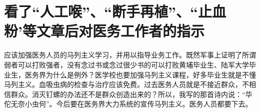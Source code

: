 \section[看了“人工喉”、“断手再植”、“止血粉’等文章后对医务工作者的指示（一九六六年三月十二日）]{看了“人工喉”、“断手再植”、“止血粉’等文章后对医务工作者的指示}


应该加强医务人员的马列主义学习，并用以指导业务工作。既然军事上证明了所谓弱者可以打败强者，没有念过书或念过很少书的可以打败黄埔毕业生、陆军大学毕业生，医务界为什么是例外？医学校也要加强马列主义课程，好多毕业生就是不懂马列主义。血吸虫病的检查与治疗应该免费。过去医务人员就是不接近群众，不相信群众。消灭钉螺的办法还不是群众创造出来的？所以，我写的那首诗内说：“华佗无奈小虫何”。今后要在医务界大力系统的宣传马列主义。医务人员都要下去。

